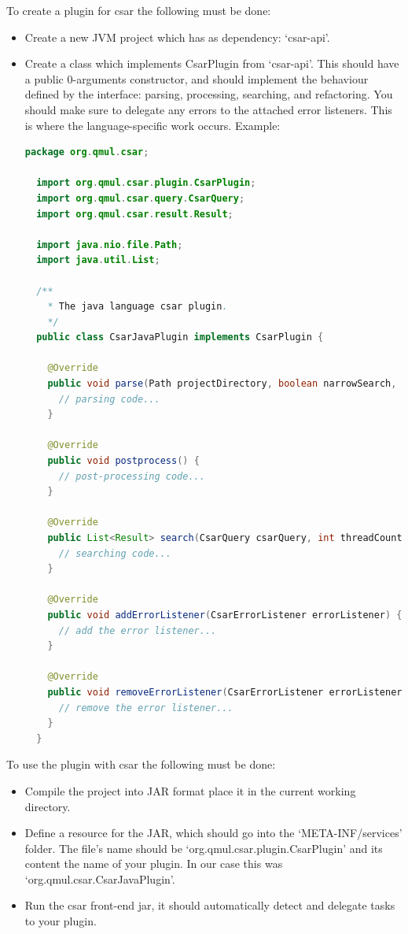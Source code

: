 \documentclass[12pt, letterpaper]{article}
\begin{document}
To create a plugin for csar the following must be done:
\begin{itemize}
  \item Create a new JVM project which has as dependency: `csar-api'.
  \item Create a class which implements CsarPlugin from `csar-api'.
  This should have a public 0-arguments constructor, and should implement the behaviour defined by the interface: parsing, processing, searching, and refactoring.
  You should make sure to delegate any errors to the attached error listeners.
  This is where the language-specific work occurs.
  Example:
  \begin{lstlisting}[language=Java]
  package org.qmul.csar;

  import org.qmul.csar.plugin.CsarPlugin;
  import org.qmul.csar.query.CsarQuery;
  import org.qmul.csar.result.Result;

  import java.nio.file.Path;
  import java.util.List;

  /**
    * The java language csar plugin.
    */
  public class CsarJavaPlugin implements CsarPlugin {

    @Override
    public void parse(Path projectDirectory, boolean narrowSearch, Path ignoreFile, int threadCount) {
      // parsing code...
    }

    @Override
    public void postprocess() {
      // post-processing code...
    }

    @Override
    public List<Result> search(CsarQuery csarQuery, int threadCount) {
      // searching code...
    }

    @Override
    public void addErrorListener(CsarErrorListener errorListener) {
      // add the error listener...
    }

    @Override
    public void removeErrorListener(CsarErrorListener errorListener) {
      // remove the error listener...
    }
  }
  \end{lstlisting}
\end{itemize}

To use the plugin with csar the following must be done:
\begin{itemize}
  \item Compile the project into JAR format place it in the current working directory.
  \item Define a resource for the JAR, which should go into the `META-INF/services' folder.
  The file's name should be `org.qmul.csar.plugin.CsarPlugin' and its content the name of your plugin.
  In our case this was `org.qmul.csar.CsarJavaPlugin'.
  \item Run the csar front-end jar, it should automatically detect and delegate tasks to your plugin.
\end{itemize}
\end{document}
